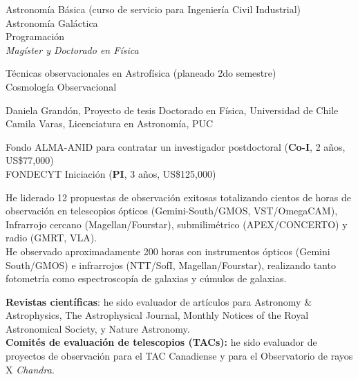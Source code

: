 \documentclass[11pt]{article}
\begin{document}
 Astronomía Básica (curso de servicio para Ingeniería Civil Industrial)\\
 Astronomía Galáctica\\
 Programación\\

\noindent
\emph{Magíster y Doctorado en Física}

 Técnicas observacionales en Astrofísica (planeado 2do semestre)\\
 Cosmología Observacional


 Daniela Grandón, Proyecto de tesis Doctorado en Física, Universidad de Chile\\
 Camila Varas, Licenciatura en Astronomía, PUC\\



\noindent
{} Fondo ALMA-ANID para contratar un investigador postdoctoral (\textbf{Co-I}, 2 años, US\$77,000)\\
 FONDECYT Iniciaci\'on (\textbf{PI}, 3 años, US\$125,000)



\noindent
He liderado 12 propuestas de observación exitosas totalizando cientos 
de horas de observación en telescopios ópticos (Gemini-South/GMOS, 
VST/OmegaCAM), Infrarrojo cercano (Magellan/Fourstar), submilimétrico 
(APEX/CONCERTO) y radio (GMRT, VLA).\\

{He observado aproximadamente 200 horas con instrumentos ópticos (Gemini 
South/GMOS) e infrarrojos (NTT/SofI, Magellan/Fourstar), realizando tanto 
fotometría como espectroscopía de galaxias y cúmulos de galaxias.}


%



\noindent\textbf{Revistas científicas}: he sido evaluador de artículos para Astronomy 
    \& Astrophysics, The Astrophysical Journal, Monthly Notices of the Royal 
    Astronomical Society, y Nature Astronomy.\\
\noindent\textbf{Comités de evaluación de telescopios (TACs):} he sido evaluador de 
    proyectos de observación para el TAC Canadiense y para el Observatorio de rayos 
    X \textit{Chandra}.
\end{document}
